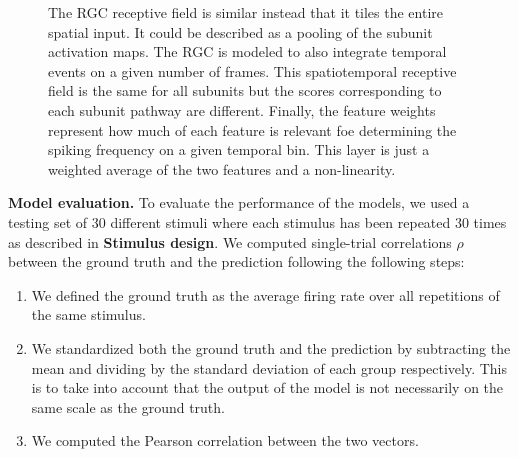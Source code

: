 \begin{figure}
{        The RGC receptive field is similar instead that it tiles the entire
        spatial input. It could be described as a pooling of the subunit
        activation
        maps. The RGC is modeled to also integrate temporal events on a given
        number of frames. This spatiotemporal receptive field is the same for
        all
        subunits but the scores corresponding to each subunit pathway are
        different.
        Finally, the feature weights represent how much of each feature is
        relevant foe
        determining the spiking frequency on a given temporal bin. This layer
        is just
        a weighted average of the two features and a non-linearity.
    }
    \label{fig:CNN_simple}
\end{figure}

\textbf{Model evaluation.}
To evaluate the performance of the models, we used a testing set of 30
different stimuli where each stimulus has been repeated 30 times as described
in \textbf{Stimulus design}.
We computed single-trial correlations $\rho$ between the ground truth and the
prediction following the following steps:
\begin{enumerate}
    \item We defined the ground truth as the average firing rate over all
          repetitions of the same stimulus.
    \item We standardized both the ground truth and the prediction by
          subtracting the mean and dividing by the standard deviation of each
          group
          respectively. This is to take into account that the output of the
          model is not
          necessarily on the same scale as the ground truth.
    \item We computed the Pearson correlation between the two vectors.
\end{enumerate}

\clearpage